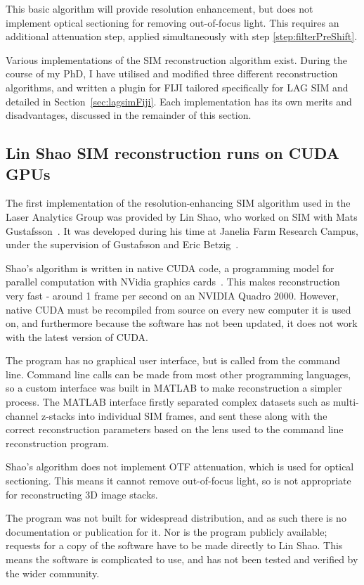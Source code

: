 This basic algorithm will provide resolution enhancement, but does not implement optical sectioning for removing out-of-focus light.
This requires an additional attenuation step, applied simultaneously with step \ref{step:filterPreShift}. 

Various implementations of the SIM reconstruction algorithm exist.
During the course of my PhD, I have utilised and modified three different reconstruction algorithms, and written a plugin for FIJI tailored specifically for LAG SIM and detailed in Section~\ref{sec:lagsimFiji}.
Each implementation has its own merits and disadvantages, discussed in the remainder of this section.

\subsection{Lin Shao SIM reconstruction runs on CUDA GPUs}
The first implementation of the resolution-enhancing SIM algorithm used in the Laser Analytics Group was provided by Lin Shao, who worked on SIM with Mats Gustafsson~\cite{shao2011super}.
It was developed during his time at Janelia Farm Research Campus, under the supervision of Gustafsson and Eric Betzig~\cite{beach2014nonmuscle}.

Shao's algorithm is written in native CUDA code, a programming model for parallel computation with NVidia graphics cards~\cite{sanders2010cuda}.
This makes reconstruction very fast - around 1 frame per second on an NVIDIA Quadro 2000. 
However, native CUDA must be recompiled from source on every new computer it is used on, and furthermore because the software has not been updated, it does not work with the latest version of CUDA. 

The program has no graphical user interface, but is called from the command line. 
Command line calls can be made from most other programming languages, so a custom interface was built in MATLAB to make reconstruction a simpler process.  
The MATLAB interface firstly separated complex datasets such as multi-channel z-stacks into individual SIM frames, and sent these along with the correct reconstruction parameters based on the lens used to the command line reconstruction program. 

Shao's algorithm does not implement OTF attenuation, which is used for optical sectioning.
This means it cannot remove out-of-focus light, so is not appropriate for reconstructing 3D image stacks. 

The program was not built for widespread distribution, and as such there is no documentation or publication for it. 
Nor is the program publicly available; requests for a copy of the software have to be made directly to Lin Shao. 
This means the software is complicated to use, and has not been tested and verified by the wider community. 

